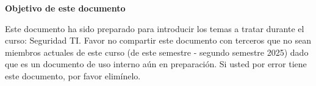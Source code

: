 \documentclass[11pt,fleqn]{book} %
\begin{document}
\noindent \textbf{Objetivo de este documento}
\vspace{0.5cm}

\noindent Este documento ha sido preparado para introducir los temas a tratar durante el curso: Seguridad TI. Favor no compartir este documento con terceros que no sean miembros actuales de este curso (de este semestre - segundo semestre 2025) dado que es un documento de uso interno aún en preparación. Si usted por error tiene este documento, por favor elimínelo.





\vspace{1cm}

\end{document}
